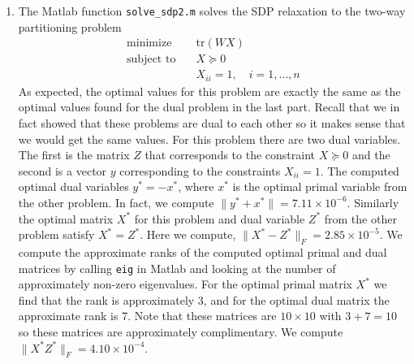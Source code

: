 \documentclass[11pt]{amsart}
\begin{document}
\begin{enumerate}
\begin{enumerate}
\item The Matlab function \texttt{solve\_sdp2.m} solves the SDP relaxation to the two-way partitioning problem
\begin{equation*}
\begin{aligned}
\mathrm{minimize} \quad & \mathrm{tr}(WX)  \\
\textrm{subject to}\quad & X \succeq 0 \\
& X_{ii} = 1,\quad i = 1,\ldots,n
\end{aligned}
\end{equation*}
As expected, the optimal values for this problem are exactly the same as the optimal values found for the dual problem in the last part.  Recall that we in fact showed that these problems are dual to each other so it makes sense that we would get the same values.  For this problem there are two dual variables.  The first is the matrix $Z$ that corresponds to the constraint $X \succeq 0$ and the second is a vector $y$ corresponding to the constraints $X_{ii} = 1$.  The computed optimal dual variables $y^* = -x^*$, where $x^*$ is the optimal primal variable from the other problem.  In fact, we compute $\|y^* + x^*\|  = 7.11 \times 10^{-6}$.  Similarly the optimal matrix $X^*$ for this problem and dual variable $Z^*$ from the other problem satisfy $X^* = Z^*$.  Here we compute, $\|X^* - Z^*\|_F = 2.85 \times 10^{-5}$.  We compute the approximate ranks of the computed optimal primal and dual matrices by calling \texttt{eig} in Matlab and looking at the number of approximately non-zero eigenvalues.  For the optimal primal matrix $X^*$ we find that the rank is approximately 3, and for the optimal dual matrix the approximate rank is 7.  Note that these matrices are $10 \times 10$ with $3 + 7 = 10$ so these matrices are approximately complimentary.  We compute $\|X^*Z^*\|_F = 4.10 \times 10^{-4}$.






\end{enumerate}
\end{enumerate}
\end{document}
